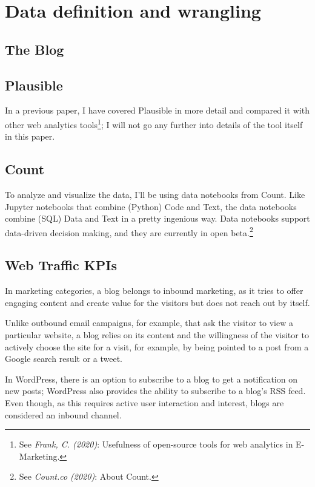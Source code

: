 %
%

\pagebreak
\section{Data definition and wrangling}

\onehalfspacing

\subsection{The Blog}

\subsection{Plausible}

In a previous paper, I have covered Plausible in more detail and compared it with other web analytics tools\footnote{See \textit{Frank, C. (2020)}: Usefulness of open-source tools for web analytics in E-Marketing.\cite{previousPaper}}; I will not go any further into details of the tool itself in this paper.

\subsection{Count}

To analyze and visualize the data, I'll be using data notebooks from Count. Like Jupyter notebooks that combine (Python) Code and Text, the data notebooks combine (SQL) Data and Text in a pretty ingenious way. Data notebooks support data-driven decision making, and they are currently in open beta.\footnote{See \textit{Count.co (2020)}: About Count.\cite{aboutCount}}

\subsection{Web Traffic KPIs}

In marketing categories, a blog belongs to inbound marketing, as it tries to offer engaging content and create value for the visitors but does not reach out by itself. 

Unlike outbound email campaigns, for example, that ask the visitor to view a particular website, a blog relies on its content and the willingness of the visitor to actively choose the site for a visit, for example, by being pointed to a post from a Google search result or a tweet.

In WordPress, there is an option to subscribe to a blog to get a notification on new posts; WordPress also provides the ability to subscribe to a blog's RSS feed. Even though, as this requires active user interaction and interest, blogs are considered an inbound channel.

